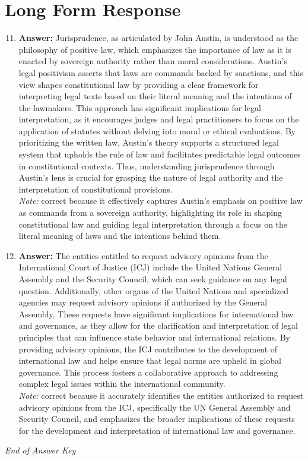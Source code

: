\documentclass[12pt]{article}
\begin{document}
\section*{Long Form Response}
\begin{enumerate}[label=\arabic*.]
\setcounter{enumi}{10}
\item \textbf{Answer:} Jurisprudence, as articulated by John Austin, is understood as the philosophy of positive law, which emphasizes the importance of law as it is enacted by sovereign authority rather than moral considerations. Austin's legal positivism asserts that laws are commands backed by sanctions, and this view shapes constitutional law by providing a clear framework for interpreting legal texts based on their literal meaning and the intentions of the lawmakers. This approach has significant implications for legal interpretation, as it encourages judges and legal practitioners to focus on the application of statutes without delving into moral or ethical evaluations. By prioritizing the written law, Austin's theory supports a structured legal system that upholds the rule of law and facilitates predictable legal outcomes in constitutional contexts. Thus, understanding jurisprudence through Austin's lens is crucial for grasping the nature of legal authority and the interpretation of constitutional provisions.
\\ \textit{Note:} correct because it effectively captures Austin's emphasis on positive law as commands from a sovereign authority, highlighting its role in shaping constitutional law and guiding legal interpretation through a focus on the literal meaning of laws and the intentions behind them.
\item \textbf{Answer:} The entities entitled to request advisory opinions from the International Court of Justice (ICJ) include the United Nations General Assembly and the Security Council, which can seek guidance on any legal question. Additionally, other organs of the United Nations and specialized agencies may request advisory opinions if authorized by the General Assembly. These requests have significant implications for international law and governance, as they allow for the clarification and interpretation of legal principles that can influence state behavior and international relations. By providing advisory opinions, the ICJ contributes to the development of international law and helps ensure that legal norms are upheld in global governance. This process fosters a collaborative approach to addressing complex legal issues within the international community.
\\ \textit{Note:} correct because it accurately identifies the entities authorized to request advisory opinions from the ICJ, specifically the UN General Assembly and Security Council, and emphasizes the broader implications of these requests for the development and interpretation of international law and governance.
\end{enumerate}

\vfill
\noindent\textit{End of Answer Key}
\end{document}
